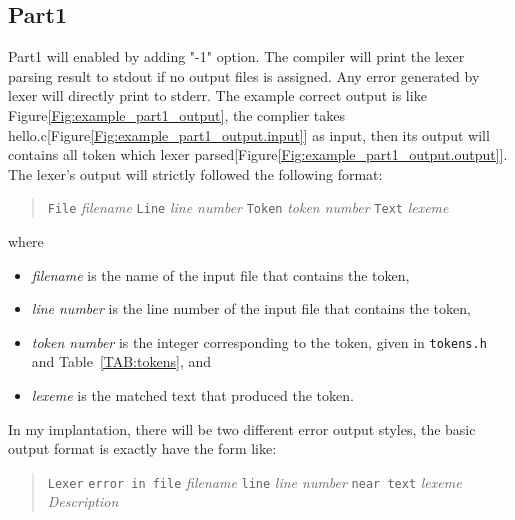 \documentclass{article}
\begin{document}
\subsection{Part1}
    Part1 will enabled by adding "-1" option. The compiler will print the lexer parsing result to stdout if no output files is assigned. Any error generated by lexer will directly print to stderr. The example correct output is like Figure\ref{Fig:example_part1_output}, the complier takes hello.c[Figure\ref{Fig:example_part1_output.input}] as input, then its output will contains all token which lexer parsed[Figure\ref{Fig:example_part1_output.output}]. The lexer's output will strictly followed the following format:
    \begin{quote}
    	{\tt File}
    	\emph{filename}
    	{\tt Line}
    	\emph{line number}
    	{\tt Token}
    	\emph{token number}
    	{\tt Text}
    	\emph{lexeme}
    \end{quote}
    where
    \begin{itemize}
    	\item \emph{filename}
    		is the name of the input file that contains the token,
    	\item \emph{line number}
    		is the line number of the input file that contains the token,
    	\item \emph{token number}
    		is the integer corresponding to the token, given in \verb|tokens.h|
    		and Table~\ref{TAB:tokens}, and
    	\item \emph{lexeme}
    		is the matched text that produced the token.
    \end{itemize}
    
    In my implantation, there will be two different error output styles, the basic output format is exactly have the form like:  
    \begin{quote}
    	\begin{tabbing}
    		{\tt Lexer} \= {\tt error in file} \emph{filename}
    		{\tt line} \emph{line number}
    		{\tt near text} \emph{lexeme}
    	\\
    		\> \emph{Description}
    	\end{tabbing}
    \end{quote}
\end{document}
